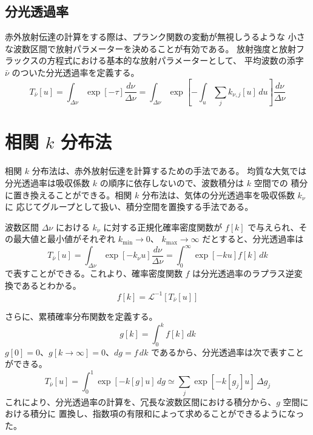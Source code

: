 \documentclass[article]{dennou777}
\begin{document}
\subsection{分光透過率}
赤外放射伝達の計算をする際は、プランク関数の変動が無視しうるような
小さな波数区間で放射パラメーターを決めることが有効である。
放射強度と放射フラックスの方程式における基本的な放射パラメーターとして、
平均波数の添字 $\bar\nu$ のついた分光透過率を定義する。
\begin{equation}
	T_{\bar\nu}[u]
	=\int_{\Delta\nu}\exp[-\tau]\frac{d\nu}{\Delta\nu}
	=\int_{\Delta\nu}\exp\left[-\int_u\sum_j k_{\nu,j}[u]\,du\right]\frac{d\nu}{\Delta\nu}
\end{equation}

\section{相関 $k$ 分布法}
相関 $k$ 分布法は、赤外放射伝達を計算するための手法である。
均質な大気では分光透過率は吸収係数 $k$ の順序に依存しないので、波数積分は $k$ 空間での
積分に置き換えることができる。相関 $k$ 分布法は、気体の分光透過率を吸収係数 $k_\nu$ に
応じてグループとして扱い、積分空間を置換する手法である。

波数区間 $\Delta\nu$ における $k_\nu$ に対する正規化確率密度関数が
$f[k]$ で与えられ、その最大値と最小値がそれぞれ $k_{\mathrm{min}}\to0$、
$k_{\mathrm{max}}\to\infty$ だとすると、分光透過率は
\begin{equation}
	T_{\bar\nu}[u]=\int_{\Delta\nu}\exp[-k_\nu u]\frac{d\nu}{\Delta\nu}
	=\int^\infty_0 \exp[-ku]f[k]\,dk
\end{equation}
で表すことができる。これより、確率密度関数 $f$ は分光透過率のラプラス逆変換であるとわかる。
\begin{equation}
	f[k]=\mathcal{L}^{-1}[T_{\bar\nu}[u]]
\end{equation}

さらに、累積確率分布関数を定義する。
\begin{equation}
	g[k]=\int^k_0 f[k]\,dk
\end{equation}
$g[0]=0$、$g[k\to\infty]=0$、$dg=f\,dk$ であるから、分光透過率は次で表すことができる。
\begin{equation}
	T_{\bar\nu}[u]=\int^1_0 \exp[-k[g]u]\,dg\simeq\sum_j\exp[-k[g_j]u]\,\Delta g_j
\end{equation}
これにより、分光透過率の計算を、冗長な波数区間における積分から、$g$ 空間における積分に
置換し、指数項の有限和によって求めることができるようになった。
\end{document}
